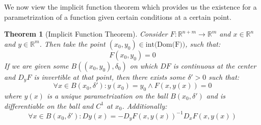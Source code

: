 \documentclass[10pt,letterpaper]{article} %
\newtheorem{thm}{Theorem}[section]
\begin{document}
We now view the implicit function theorem which provides us the existence for a parametrization of a function given certain conditions at a certain point.
\begin{thm}[Implicit Function Theorem]
Consider $F: \mathbb{R}^{n+m} \xrightarrow{} \mathbb{R}^m$ and $x \in \mathbb{R}^n$ and $y \in \mathbb{R}^m$. Then take the point $(x_0, y_0) \in \text{int(Dom(F))}$, such that:
\begin{equation*}
F(x_0, y_0) = 0
\end{equation*}
If we are given some $B((x_0, y_0), \delta_0)$ on which $DF$ is continuous at the center and $D_yF$ is invertible at that point, then there exists some $\delta' > 0$ such that:
\begin{equation*}
\forall x \in B(x_0, \delta'): y(x_0) = y_0 \land F(x, y(x)) = 0
\end{equation*}
where $y(x)$ is a unique parametrization on the ball $B(x_0, \delta')$ and is differentiable on the ball and $C^1$ at $x_0$. Additionally:
\begin{equation*}
\forall x \in B(x_0, \delta'): Dy(x) = -D_yF(x, y(x))^{-1}D_xF(x, y(x))
\end{equation*}
\end{thm}
\end{document}
